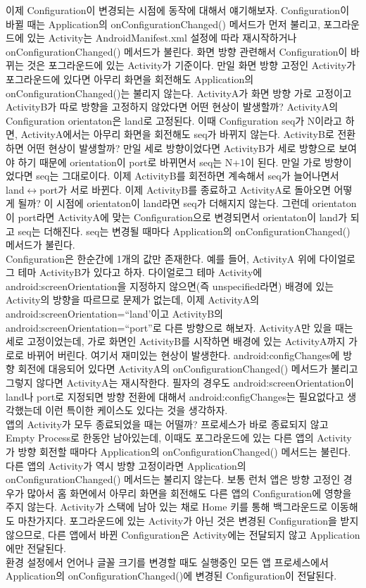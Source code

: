 이제 Configuration이 변경되는 시점에 동작에 대해서 얘기해보자. Configuration이 바뀔 때는 Application의 onConfigurationChanged() 메서드가 먼저 불리고, 포그라운드에 있는 Activity는 AndroidManifest.xml 설정에 따라 재시작하거나 onConfigurationChanged() 메서드가 불린다.
화면 방향 관련해서 Configuration이 바뀌는 것은 포그라운드에 있는 Activity가 기준이다. 만일 화면 방향 고정인 Activity가 포그라운드에 있다면 아무리 화면을 회전해도 Application의 onConfigurationChanged()는 불리지 않는다. ActivityA가 화면 방향 가로 고정이고 ActivityB가 따로 방향을 고정하지 않았다면 어떤 현상이 발생할까? ActivityA의 Configuration orientaton은 land로 고정된다. 이때 Configuration seq가 N이라고 하면, ActivityA에서는 아무리 화면을 회전해도 seq가 바뀌지 않는다. ActivityB로 전환하면 어떤 현상이 발생할까? 만일 세로 방향이었다면 ActivityB가 세로 방향으로 보여야 하기 때문에 orientation이 port로 바뀌면서 seq는 N+1이 된다. 만일 가로 방향이었다면 seq는 그대로이다. 이제 ActivityB를 회전하면 계속해서 seq가 늘어나면서 land$\leftrightarrow$port가 서로 바뀐다. 이제 ActivityB를 종료하고 ActivityA로 돌아오면 어떻게 될까? 이 시점에 orientaton이 land라면 seq가 더해지지 않는다. 그런데 orientaton이 port라면 ActivityA에 맞는 Configuration으로 변경되면서 orientaton이 land가 되고 seq는 더해진다. seq는 변경될 때마다 Application의 onConfigurationChanged() 메서드가 불린다.\\

Configuration은 한순간에 1개의 값만 존재한다. 예를 들어, ActivityA 위에 다이얼로그 테마 ActivityB가 있다고 하자. 다이얼로그 테마 Activity에 android:screenOrientation을 지정하지 않으면(즉 unspecified라면) 배경에 있는 Activity의 방향을 따르므로 문제가 없는데, 이제 ActivityA의 android:screenOrientation=``land'이고 ActivityB의 android:screenOrientation=``port''로 다른 방향으로 해보자. 
ActivityA만 있을 때는 세로 고정이었는데, 가로 화면인 ActivityB를 시작하면 배경에 있는 ActivityA까지 가로로 바뀌어 버린다. 여기서 재미있는 현상이 발생한다. android:configChanges에 방향 회전에 대응되어 있다면 ActivityA의 onConfigurationChanged() 메서드가 불리고 그렇지 않다면 ActivityA는 재시작한다.  필자의 경우도 android:screenOrientation이 land나 port로 지정되면 방향 전환에 대해서 android:configChanges는 필요없다고 생각했는데 이런 특이한 케이스도 있다는 것을 생각하자.\\


앱의 Activity가 모두 종료되었을 때는 어떨까? 프로세스가 바로 종료되지 않고 Empty Process로 한동안 남아있는데, 이때도 포그라운드에 있는 다른 앱의 Activity가 방향 회전할 때마다 Application의 onConfigurationChanged() 메서드는 불린다. 
다른 앱의 Activity가 역시 방향 고정이라면 Application의 onConfigurationChanged() 메서드는 불리지 않는다. 보통 런처 앱은 방향 고정인 경우가 많아서 홈 화면에서 아무리 화면을 회전해도 다른 앱의 Configuration에 영향을 주지 않는다. 
Activity가 스택에 남아 있는 채로 Home 키를 통해 백그라운드로 이동해도 마찬가지다. 포그라운드에 있는 Activity가 아닌 것은 변경된 Configuration을 받지 않으므로, 다른 앱에서 바뀐 Configuration은 Activity에는 전달되지 않고 Application에만 전달된다.\\

환경 설정에서 언어나 글꼴 크기를 변경할 때도 실행중인 모든 앱 프로세스에서 Application의 onConfigurationChanged()에 변경된 Configuration이 전달된다.\\





